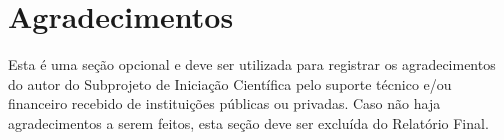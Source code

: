 \documentclass[10pt, a4paper]{article}
\begin{document}
\section*{Agradecimentos}

Esta é uma seção opcional e deve ser utilizada para registrar os agradecimentos do autor do Subprojeto de Iniciação Científica pelo suporte técnico e/ou financeiro recebido de instituições públicas ou privadas. Caso não haja agradecimentos a serem feitos, esta seção deve ser excluída do Relatório Final.


%


\renewcommand{\bibsection}{\section*{Referências Bibliográficas}}

\end{document}
